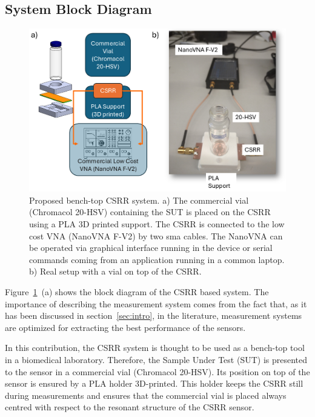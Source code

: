 \documentclass[journal,twoside,web]{ieeecolor}
\begin{document}
\subsection{System Block Diagram}\label{ssec:sysBlockD}

\begin{figure}[!t]
	\centering
	\includegraphics [trim = 0mm 0mm 0mm 0mm, clip, width=1\columnwidth]{figures/fig1.png}
	\caption{Proposed bench-top CSRR system. a) The commercial vial (Chromacol 20-HSV) containing the SUT is placed on the CSRR using a PLA 3D printed support. The CSRR is connected to the low cost VNA (NanoVNA F-V2) by two sma cables. The NanoVNA can be operated via graphical interface running in the device or serial commands coming from an application running in a common laptop. b) Real setup with a vial on top of the CSRR.}
	\label{fig:senBlockD}
	\vspace{-0.3cm}
\end{figure}

Figure~\ref{fig:senBlockD}~(a) shows the block diagram of the CSRR based system. The importance of describing the measurement system comes from the fact that, as it has been discussed in section~\ref{sec:intro}, in the literature, measurement systems are optimized for extracting the best performance of the sensors. 

In this contribution, the CSRR system is thought to be used as a bench-top tool in a biomedical laboratory. Therefore, the Sample Under Test (SUT) is presented to the sensor in a commercial vial (Chromacol 20-HSV). Its position on top of the sensor is ensured by a PLA holder 3D-printed. This holder keeps the CSRR still during measurements and ensures that the commercial vial is placed always centred with respect to the resonant structure of the CSRR sensor. 
\end{document}
